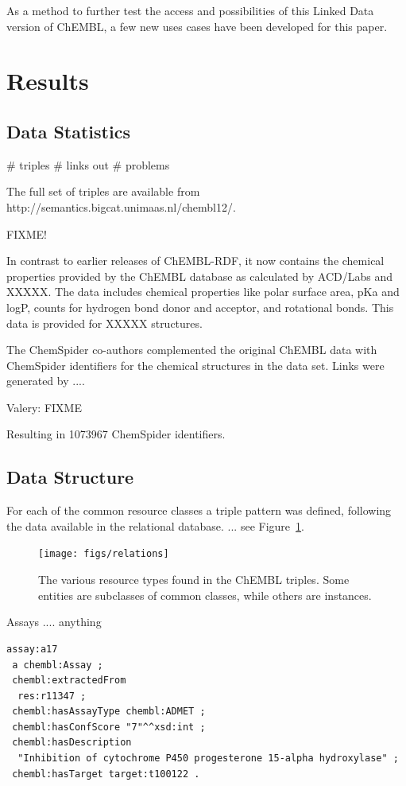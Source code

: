 \documentclass[sw]{iosart2c}
\begin{document}
As a method to further test the access and possibilities of this Linked Data version of
ChEMBL, a few new uses cases have been developed for this paper.

\section{Results}\label{s3}

\subsection{Data Statistics}

\# triples
\# links out
\# problems

The full set of triples are available from http://semantics.bigcat.unimaas.nl/chembl12/.

FIXME!

In contrast to earlier releases of ChEMBL-RDF, it now contains the chemical properties
provided by the ChEMBL database as calculated by ACD/Labs and XXXXX. The data includes
chemical properties like polar surface area, pKa and logP, counts for hydrogen bond donor
and acceptor, and rotational bonds. This data is provided for XXXXX structures.

The ChemSpider co-authors complemented the original ChEMBL data with ChemSpider identifiers
for the chemical structures in the data set. Links were generated by ....

Valery: FIXME

Resulting in 1073967 ChemSpider identifiers.

\subsection{Data Structure}

For each of the common resource classes a triple pattern was defined, following the
data available in the relational database. ... see Figure~\ref{f1}.

\begin{figure}[t]
\texttt{[image: figs/relations]}
\caption{The various resource types found in the ChEMBL triples. Some entities are subclasses
of common classes, while others are instances.}\label{f1}
\end{figure}

Assays .... anything

\begin{small}
\begin{verbatim}
assay:a17
 a chembl:Assay ;
 chembl:extractedFrom
  res:r11347 ;
 chembl:hasAssayType chembl:ADMET ;
 chembl:hasConfScore "7"^^xsd:int ;
 chembl:hasDescription
  "Inhibition of cytochrome P450 progesterone 15-alpha hydroxylase" ;
 chembl:hasTarget target:t100122 .
\end{verbatim}
\end{small}
\end{document}
